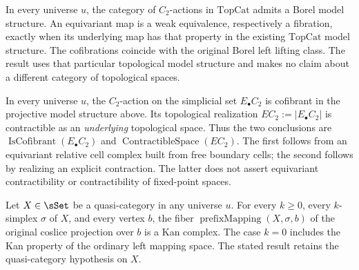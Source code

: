 \begin{resultblock}
\begin{theorem}
In every universe $u$, the category of $C_2$-actions in
$\mathrm{TopCat}$ admits a Borel model structure.
An equivariant map is a weak equivalence, respectively a fibration, exactly
when its underlying map has that property in the existing
$\mathrm{TopCat}$ model structure.
The cofibrations coincide with the original Borel left lifting class.
The result uses that particular topological model structure and makes no claim
about a different category of topological spaces.
\end{theorem}
\end{resultblock}

\begin{resultblock}
\begin{theorem}
In every universe $u$, the $C_2$-action on the simplicial set
$E_{\bullet}C_2$ is cofibrant in the projective model structure above.
Its topological realization $EC_2:=|E_{\bullet}C_2|$ is contractible as an
\emph{underlying} topological space.
Thus the two conclusions are $\operatorname{IsCofibrant}(E_{\bullet}C_2)$ and
$\operatorname{ContractibleSpace}(EC_2)$.
The first follows from an equivariant relative cell complex built from free
boundary cells; the second follows by realizing an explicit contraction.
The latter does not assert equivariant contractibility or contractibility of
fixed-point spaces.
\end{theorem}
\end{resultblock}

\begin{resultblock}
\begin{proposition}
Let $X\in\sSet$ be a quasi-category in any universe $u$.
For every $k\geq0$, every $k$-simplex $\sigma$ of $X$, and every vertex $b$,
the fiber $\operatorname{prefixMapping}(X,\sigma,b)$ of the original coslice
projection over $b$ is a Kan complex.
The case $k=0$ includes the Kan property of the ordinary left mapping space.
The stated result retains the quasi-category hypothesis on $X$.
\end{proposition}
\end{resultblock}

